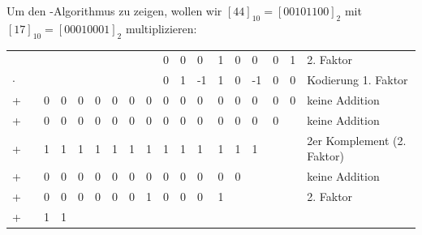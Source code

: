 Um den -Algorithmus zu zeigen, wollen wir $[44]_{10}=[00101100]_2$ mit $[17]_{10}=[00010001]_2$ multiplizieren: \\
\begin{tabularx}{\textwidth}{XXXXXXXXXXXXXXXXX|p{3.2cm}}
	 &
	 &
	\cellcolor{lightgray} & \cellcolor{lightgray} & \cellcolor{lightgray} & \cellcolor{lightgray} & \cellcolor{lightgray} & \cellcolor{lightgray} & \cellcolor{lightgray} &
	\cellcolor{gray} 0 &
	\cellcolor{gray} 0 &
	\cellcolor{gray} 0 &
	\cellcolor{gray} 1 &
	\cellcolor{gray} 0 &
	\cellcolor{gray} 0 &
	\cellcolor{gray} 0 &
	\cellcolor{gray} 1 &
	\tiny 2. Faktor \\
	$\cdot$ &
	 &
	\cellcolor{lightgray} & \cellcolor{lightgray} & \cellcolor{lightgray} & \cellcolor{lightgray} & \cellcolor{lightgray} & \cellcolor{lightgray} & \cellcolor{lightgray} &
	\cellcolor{gray} 0 &
	\cellcolor{gray} 1 &
	\cellcolor{gray} -1 &
	\cellcolor{gray} 1 &
	\cellcolor{gray} 0 &
	\cellcolor{gray} -1 &
	\cellcolor{gray} 0 &
	\cellcolor{gray} 0 &
	\tiny Kodierung 1. Faktor \\
	\hline
	+ &
	&
	\cellcolor{lightgray} 0& \cellcolor{lightgray} 0& \cellcolor{lightgray} 0& \cellcolor{lightgray} 0& \cellcolor{lightgray} 0& \cellcolor{lightgray} 0& \cellcolor{lightgray} 0&
	0 &
	0 &
	0 &
	0 &
	0 &
	0 &
	0 &
	0 &
	\tiny keine Addition \\
	+ &
	&
	\cellcolor{lightgray} 0& \cellcolor{lightgray} 0& \cellcolor{lightgray} 0& \cellcolor{lightgray} 0& \cellcolor{lightgray} 0& \cellcolor{lightgray} 0& 
	0 &
	0 &
	0 &
	0 &
	0 &
	0 &
	0 &
	0 &
	\cellcolor{lightgray} &
	\tiny keine Addition \\
	+ &
	&
	\cellcolor{lightgray} 1& \cellcolor{lightgray} 1& \cellcolor{lightgray} 1& \cellcolor{lightgray} 1& \cellcolor{lightgray} 1&
	1 & 
	1 &
	1 &
	1 &
	1 &
	1 &
	1 &
	1 &
	\cellcolor{lightgray} &
	\cellcolor{lightgray} &
	\tiny 2er Komplement (2. Faktor) \\
	+ &
	&
	\cellcolor{lightgray} 0& \cellcolor{lightgray} 0& \cellcolor{lightgray} 0& \cellcolor{lightgray} 0&
	0 &
	0 & 
	0 &
	0 &
	0 &
	0 &
	0 &
	0 &
	\cellcolor{lightgray} &
	\cellcolor{lightgray} &
	\cellcolor{lightgray} &
	\tiny keine Addition \\
	+ &
	&
	\cellcolor{lightgray} 0& \cellcolor{lightgray} 0& \cellcolor{lightgray} 0&
	0 &
	0 &
	0 & 
	1 &
	0 &
	0 &
	0 &
	1 &
	\cellcolor{lightgray} &
	\cellcolor{lightgray} &
	\cellcolor{lightgray} &
	\cellcolor{lightgray} &
	\tiny 2. Faktor \\
	+ &
	&
	\cellcolor{lightgray} 1& \cellcolor{lightgray} 1&

\end{tabularx}
